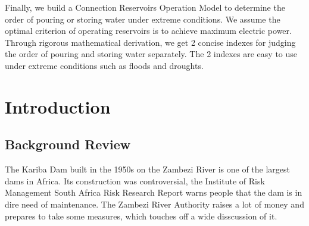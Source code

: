 \documentclass[12pt]{article}%
\begin{document}
\par\noindent
\par\noindent
Finally, we build a Connection Reservoirs Operation Model to determine the order of pouring or storing water under extreme conditions. We assume the optimal criterion of operating reservoirs is to achieve maximum electric power. Through rigorous mathematical derivation, we get 2 concise indexes for judging the order of pouring and storing water separately. The 2 indexes are  easy to use under extreme conditions such as floods and droughts.
\thispagestyle{empty}

\newpage
\maketitle%

\tableofcontents%
\thispagestyle{empty}
\setcounter{page}{0}
\newpage%
\pagestyle{fancy} %
\fancyhf{}
\section{Introduction}
\subsection{Background Review}
The Kariba Dam built in the 1950s on the Zambezi River is one of the largest dams in Africa. Its construction was controversial, the Institute of Risk Management South Africa Risk Research Report warns people that the dam is in dire need of maintenance. The Zambezi River Authority raises a lot of money and prepares to take some measures, which touches off a wide disscussion of it.
\end{document}
